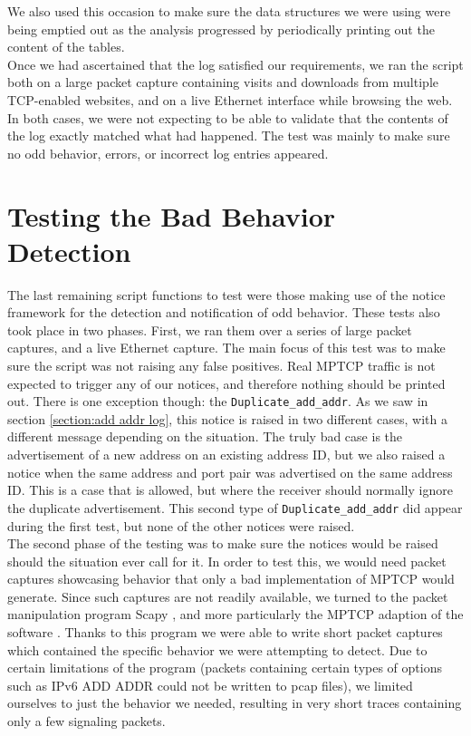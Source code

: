 We also used this occasion to make sure the data structures we were using were being emptied out as the analysis progressed by periodically printing out the content of the tables. \\

Once we had ascertained that the log satisfied our requirements, we ran the script both on a large packet capture containing visits and downloads from multiple TCP-enabled websites, and on a live Ethernet interface while browsing the web. In both cases, we were not expecting to be able to validate that the contents of the log exactly matched what had happened. The test was mainly to make sure no odd behavior, errors, or incorrect log entries appeared.

\section{Testing the Bad Behavior Detection}
The last remaining script functions to test were those making use of the notice framework for the detection and notification of odd behavior. These tests also took place in two phases. First, we ran them over a series of large packet captures, and a live Ethernet capture. The main focus of this test was to make sure the script was not raising any false positives. Real MPTCP traffic is not expected to trigger any of our notices, and therefore nothing should be printed out. There is one exception though: the \texttt{Duplicate\_add\_addr}. As we saw in section \ref{section:add addr log}, this notice is raised in two different cases, with a different message depending on the situation. The truly bad case is the advertisement of a new address on an existing address ID, but we also raised a notice when the same address and port pair was advertised on the same address ID. This is a case that is allowed, but where the receiver should normally ignore the duplicate advertisement. This second type of \texttt{Duplicate\_add\_addr} did appear during the first test, but none of the other notices were raised. \\

The second phase of the testing was to make sure the notices would be raised should the situation ever call for it.  In order to test this, we would need packet captures showcasing behavior that only a bad implementation of MPTCP would generate. Since such captures are not readily available, we turned to the packet manipulation program Scapy \citep{scapy}, and more particularly the MPTCP adaption of the software \citep{mpscapy}. Thanks to this program we were able to write short packet captures which contained the specific behavior we were attempting to detect. Due to certain limitations of the program (packets containing certain types of options such as IPv6 ADD ADDR could not be written to pcap files), we limited ourselves to just the behavior we needed, resulting in very short traces containing only a few signaling packets.\\

